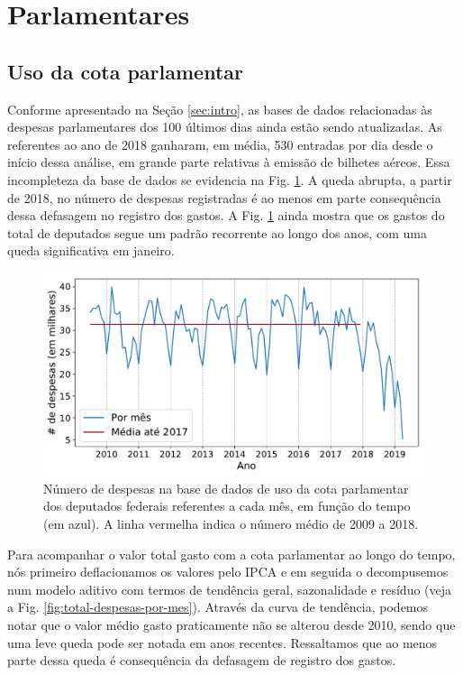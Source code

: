 \documentclass[12pt,a4paper]{article}
\begin{document}
\section{Parlamentares}


\subsection{Uso da cota parlamentar}

Conforme apresentado na Seção \ref{sec:intro}, as bases de dados relacionadas às despesas parlamentares dos 100 últimos
dias ainda estão sendo atualizadas. As referentes ao ano de 2018 ganharam, em média, 530 entradas por dia desde o início
dessa análise, em grande parte relativas à emissão de bilhetes aéreos. Essa incompleteza da base de dados se evidencia
na Fig. \ref{fig:n-despesas-por-mes}. A queda abrupta, a partir de 2018, no número de despesas registradas é ao menos
em parte consequência dessa defasagem no registro dos gastos. A Fig. \ref{fig:n-despesas-por-mes} ainda mostra que
os gastos do total de deputados segue um padrão recorrente ao longo dos anos, com uma queda significativa em janeiro.

\begin{figure}[t]
\centering
\includegraphics[width=1.0\textwidth]{graficos/n_despesas_por_mes_2019-04-29.pdf}
\caption{Número de despesas na base de dados de uso da cota parlamentar dos deputados federais
  referentes a cada mês, em função do tempo (em azul).
  A linha vermelha indica o número médio de 2009 a 2018.}
\label{fig:n-despesas-por-mes}
\end{figure} 

Para acompanhar o valor total gasto com a cota parlamentar ao longo do tempo, nós primeiro deflacionamos os
valores pelo IPCA e em seguida o decompusemos num modelo aditivo com termos de tendência geral, sazonalidade e
resíduo (veja a Fig. \ref{fig:total-despesas-por-mes}). Através da curva de tendência, podemos notar que
o valor médio gasto praticamente não se alterou desde 2010, sendo que uma leve queda pode ser notada em anos
recentes. Ressaltamos que ao menos parte dessa queda é consequência da defasagem de registro dos gastos.
\end{document}
